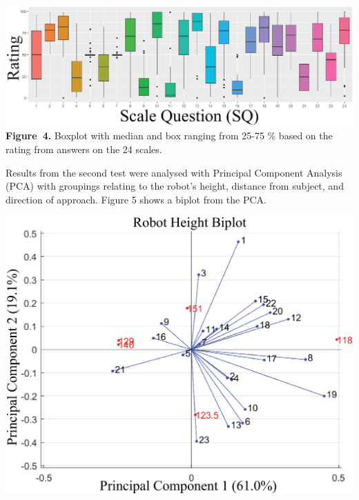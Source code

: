 \documentclass[paperwidth=118cm,paperheight=84cm,landscape,fontscale=0.2941]{baposter}
\begin{document}
\begin{poster}
{\begin{center}
\vspace{-10pt}
	\includegraphics[width=\linewidth]{BoksplotFarver24klip.eps}
\textbf{Figure~4. }\footnotesize{Boxplot with median and box ranging from 25-75 \% based on the rating from answers on the 24 scales.}
\end{center}
\vspace{-10pt}
Results from the second test were analysed with Principal Component Analysis (PCA) with groupings relating to the robot's height, distance from subject, and direction of approach. Figure 5 shows a biplot from the PCA.
\begin{center}
\vspace{-10pt}
	\includegraphics[width=0.9\linewidth]{RHeight-Biplot.eps}	
	\vspace{-5pt}


\end{center}}
\end{poster}
\end{document}
